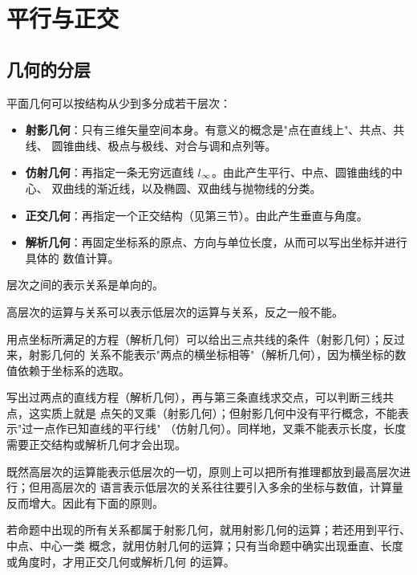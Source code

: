 \chapter{平行与正交}

\section{几何的分层}

平面几何可以按结构从少到多分成若干层次：

\begin{itemize}
\item \textbf{射影几何}：只有三维矢量空间本身。有意义的概念是"点在直线上"、共点、共线、
圆锥曲线、极点与极线、对合与调和点列等。
\item \textbf{仿射几何}：再指定一条无穷远直线 $l_{\infty}$。由此产生平行、中点、圆锥曲线的中心、
双曲线的渐近线，以及椭圆、双曲线与抛物线的分类。
\item \textbf{正交几何}：再指定一个正交结构（见第三节）。由此产生垂直与角度。
\item \textbf{解析几何}：再固定坐标系的原点、方向与单位长度，从而可以写出坐标并进行具体的
数值计算。
\end{itemize}

层次之间的表示关系是单向的。

\begin{proposition}[层次的表示]
高层次的运算与关系可以表示低层次的运算与关系，反之一般不能。
\end{proposition}

\begin{example}
用点坐标所满足的方程（解析几何）可以给出三点共线的条件（射影几何）；反过来，射影几何的
关系不能表示"两点的横坐标相等"（解析几何），因为横坐标的数值依赖于坐标系的选取。
\end{example}

\begin{example}
写出过两点的直线方程（解析几何），再与第三条直线求交点，可以判断三线共点，这实质上就是
点矢的叉乘（射影几何）；但射影几何中没有平行概念，不能表示"过一点作已知直线的平行线"
（仿射几何）。同样地，叉乘不能表示长度，长度需要正交结构或解析几何才会出现。
\end{example}

既然高层次的运算能表示低层次的一切，原则上可以把所有推理都放到最高层次进行；但用高层次的
语言表示低层次的关系往往要引入多余的坐标与数值，计算量反而增大。因此有下面的原则。

\begin{proposition}[解题层次的选取]
若命题中出现的所有关系都属于射影几何，就用射影几何的运算；若还用到平行、中点、中心一类
概念，就用仿射几何的运算；只有当命题中确实出现垂直、长度或角度时，才用正交几何或解析几何
的运算。
\end{proposition}

